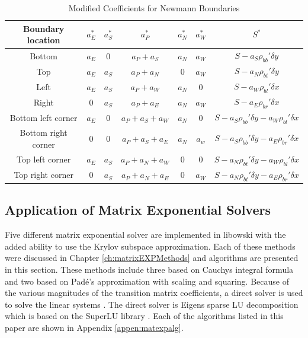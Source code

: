 \begin{table}[htbp]
    \caption{\label{tab:newmannBoundaries} Modified Coefficients for Newmann Boundaries}
    \centering
    \begin{tabular}{c|c|c|c|c|c|c}
    \hline
    \textbf{Boundary location} & \textbf{$a_{E}^{*}$} & \textbf{$a_{S}^{*}$} & \textbf{$a_{P}^{*}$} & \textbf{$a_{N}^{*}$} & \textbf{$a_{W}^{*}$} & \textbf{$S^{*}$} \\ [0.5ex]
    \hline
    \hline
    Bottom & $a_{E}$ & $0$ & $a_{P} + a_{S}$ & $a_{N}$ & $a_{W}$ & $S - a_{S}\rho_{bb}'\delta y$\\ \hline
    Top & $a_{E}$ & $a_{S}$ & $a_{P} + a_{N}$ & $0$ & $a_{W}$ & $S - a_{N}\rho_{bt}'\delta y$ \\ \hline 
    Left & $a_{E}$ & $a_{S}$ & $a_{P} + a_{W}$ & $a_{N}$ & $0$ & $S - a_{W}\rho_{bl}'\delta x$  \\ \hline
    Right & $0$ & $a_{S}$ & $a_{P} + a_{E}$ & $a_{N}$ & $a_{W}$ & $S - a_{E}\rho_{br}'\delta x$  \\ \hline
    Bottom left corner & $a_{E}$ & $0$ & $a_{P} + a_{S} + a_{W}$ & $a_{N}$ & $0$ & $S - a_{S}\rho_{bb}'\delta y - a_{W}\rho_{bl}'\delta x$ \\ \hline
    Bottom right corner & $0$ & $0$ & $a_{P} + a_{S} + a_{E}$ & $a_{N}$ & $a_{w}$ & $S - a_{S}\rho_{bb}'\delta y - a_{E}\rho_{br}'\delta x$ \\ \hline
    Top left corner & $a_{E}$ & $a_{S}$ & $a_{P} + a_{N} + a_{W}$ & $0$ & $0$ & $S - a_{N}\rho_{bt}'\delta y - a_{W}\rho_{bl}'\delta x$ \\ \hline
    Top right corner & $0$ & $a_{S}$ & $a_{P} + a_{N} + a_{E}$ & $0$ & $a_{W}$ & $S - a_{N}\rho_{bt}'\delta y - a_{E}\rho_{br}'\delta x$ \\ \hline
    \end{tabular}
\end{table}

\subsection{Application of Matrix Exponential Solvers}
Five different matrix exponential solver are implemented in libowski with the added ability to use the Krylov subspace approximation. Each of these methods were discussed in Chapter \ref{ch:matrixEXPMethods} and algorithms are presented in this section. These methods include three based on Cauchys integral formula and two based on Pad\'e's approximation with scaling and squaring. Because of the  various magnitudes of the transition matrix coefficients, a direct solver is used to solve the linear systems \cite{pusa2013}. The direct solver is Eigens sparse LU decomposition which is based on the SuperLU library \cite{eigen} \cite{superlu99}. Each of the algorithms listed in this paper are shown in Appendix \ref{appen:matexpalg}.

